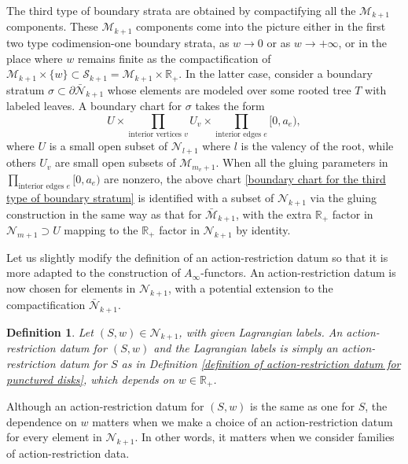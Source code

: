 \documentclass{amsart}
\newtheorem{definition}[theorem]{Definition}
\numberwithin{equation}{section}
\numberwithin{figure}{section}
\begin{document}
	The third type of boundary strata are obtained by compactifying all the $\mathcal{M}_{k+1}$ components. These $\mathcal{M}_{k+1}$ components come into the picture either in the first two type codimension-one boundary strata, as $w \to 0$ or as $w \to +\infty$, or in the place where $w$ remains finite as the compactification of $\mathcal{M}_{k+1} \times \{w\} \subset \mathcal{S}_{k+1} = \mathcal{M}_{k+1} \times \mathbb{R}_{+}$. In the latter case, consider a boundary stratum $\sigma \subset \partial \bar{\mathcal{N}}_{k+1}$ whose elements are modeled over some rooted tree $T$ with labeled leaves. A boundary chart for $\sigma$ takes the form
\begin{equation}\label{boundary chart for the third type of boundary stratum}
U \times \prod_{\text{interior vertices } v} U_{v} \times \prod_{\text{interior edges } e} [0, a_{e}),
\end{equation}
where $U$ is a small open subset of $\mathcal{N}_{l+1}$ where $l$ is the valency of the root, while others $U_{v}$ are small open subsets of $\mathcal{M}_{m_{v}+1}$. When all the gluing parameters in $\prod_{\text{interior edges } e} [0, a_{e})$ are nonzero, the above chart \eqref{boundary chart for the third type of boundary stratum} is identified with a subset of $\mathcal{N}_{k+1}$ via the gluing construction in the same way as that for $\bar{\mathcal{M}}_{k+1}$, with the extra $\mathbb{R}_{+}$ factor in $\mathcal{N}_{m+1} \supset U$ mapping to the $\mathbb{R}_{+}$ factor in $\mathcal{N}_{k+1}$ by identity. \par
	Let us slightly modify the definition of an action-restriction datum so that it is more adapted to the construction of $A_{\infty}$-functors. An action-restriction datum is now chosen for elements in $\mathcal{N}_{k+1}$, with a potential extension to the compactification $\bar{\mathcal{N}}_{k+1}$. \par

\begin{definition}
	Let $(S, w) \in \mathcal{N}_{k+1}$, with given Lagrangian labels. An action-restriction datum for $(S, w)$ and the Lagrangian labels is simply an action-restriction datum for $S$ as in Definition \ref{definition of action-restriction datum for punctured disks}, which depends on $w \in \mathbb{R}_{+}$.
\end{definition}

	Although an action-restriction datum for $(S, w)$ is the same as one for $S$, the dependence on $w$ matters when we make a choice of an action-restriction datum for every element in $\mathcal{N}_{k+1}$. In other words, it matters when we consider families of action-restriction data. \par
\end{document}
